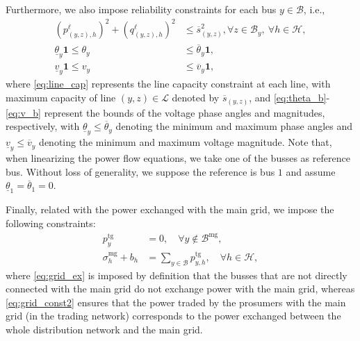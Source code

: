 \documentclass{IEEEtran}  %
\newcommand{\mc}{\mathcal}
\newcommand{\0}{\mathbf{0}}
\newcommand{\1}{\mathbf{1}}
\begin{document}
\smallskip
Furthermore, we also impose reliability constraints for each bus $y \in \mc B$, i.e.,
\begin{subequations}
\label{eq:line}
\begin{align}
	(p_{(y,z),h}^{\ell})^2 + (q_{(y,z),h}^{\ell})^2 &\leq \overline{s}_{(y,z)}^2, \forall z\in\mc B_y, \ \forall h\in \mc H, \label{eq:line_cap}\\
	\underline{\theta}_y\1 \leq \theta_y &\leq \overline{\theta}_y\1,  \label{eq:theta_b}\\
	\underline{v}_y\1 \leq v_y &\leq \overline v_y\1, \label{eq:v_b}
\end{align}
\end{subequations}
where \eqref{eq:line_cap} represents the line capacity constraint at each line, with maximum capacity of line $(y,z) \in \mc L$ denoted by $\overline{s}_{(y,z)}$, and \eqref{eq:theta_b}-\eqref{eq:v_b} represent the bounds of the voltage phase angles and magnitudes, respectively, with $\underline{\theta}_y \leq \overline{\theta}_y$ denoting the minimum and maximum phase angles and $\underline{v}_y\leq \overline v_y$ denoting the minimum and maximum voltage magnitude. Note that, when linearizing the power flow equations, we take one of the busses as reference bus. Without loss of generality, we suppose the reference is bus $1$ and assume $\underline{\theta}_1 = \overline{\theta}_1=0$.  \color{black}

Finally, related with the power exchanged with the main grid, we impose the following constraints:
\begin{subequations}
\begin{align}
	p^{\mathrm{tg}}_{y} &= 0, \quad \forall y \notin \mc B^{\mathrm{mg}}, \label{eq:grid_ex}\\
	\sigma^{\textrm{mg}}_h + b_h &= \sum_{y\in\mc B}p^{\mathrm{tg}}_{y,h}, \quad \forall h \in \mathcal H, \label{eq:grid_const2}
\end{align}
\end{subequations}
where \eqref{eq:grid_ex} is imposed by definition that the busses that are not directly connected with the main grid do not exchange  power with the main grid, whereas \eqref{eq:grid_const2} ensures that the power traded by the prosumers with the main grid (in the trading network) corresponds to the power exchanged between the whole distribution network and the main grid.
\end{document}

